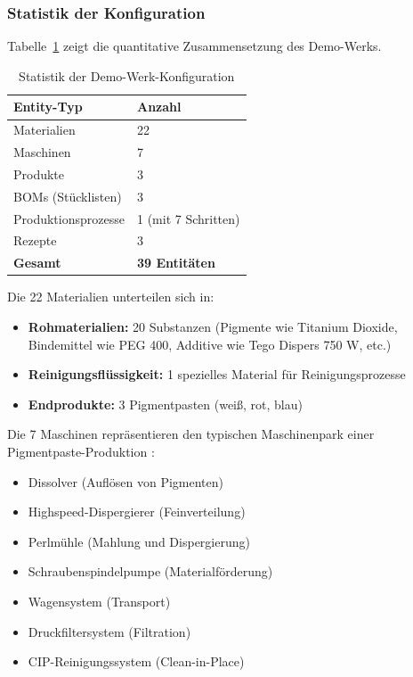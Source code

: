 \subsubsection{Statistik der Konfiguration}

Tabelle~\ref{tab:demo_werk_statistik} zeigt die quantitative Zusammensetzung des Demo-Werks.

\begin{table}[h]
\centering
\caption{Statistik der Demo-Werk-Konfiguration}
\label{tab:demo_werk_statistik}
\begin{tabular}{ll}
\toprule
\textbf{Entity-Typ} & \textbf{Anzahl} \\
\midrule
Materialien & 22 \\
Maschinen & 7 \\
Produkte & 3 \\
BOMs (Stücklisten) & 3 \\
Produktionsprozesse & 1 (mit 7 Schritten) \\
Rezepte & 3 \\
\midrule
\textbf{Gesamt} & \textbf{39 Entitäten} \\
\bottomrule
\end{tabular}
\end{table}

Die 22 Materialien unterteilen sich in:

\begin{itemize}
    \item \textbf{Rohmaterialien:} 20 Substanzen (Pigmente wie Titanium Dioxide, Bindemittel wie PEG 400, Additive wie Tego Dispers 750 W, etc.)
    \item \textbf{Reinigungsflüssigkeit:} 1 spezielles Material für Reinigungsprozesse
    \item \textbf{Endprodukte:} 3 Pigmentpasten (weiß, rot, blau)
\end{itemize}

\noindent Die 7 Maschinen repräsentieren den typischen Maschinenpark einer Pigmentpaste-Produktion \citep{brock:lacktechnologie2020}:

\begin{itemize}
    \item Dissolver (Auflösen von Pigmenten)
    \item Highspeed-Dispergierer (Feinverteilung)
    \item Perlmühle (Mahlung und Dispergierung)
    \item Schraubenspindelpumpe (Materialförderung)
    \item Wagensystem (Transport)
    \item Druckfiltersystem (Filtration)
    \item CIP-Reinigungssystem (Clean-in-Place)
\end{itemize}

